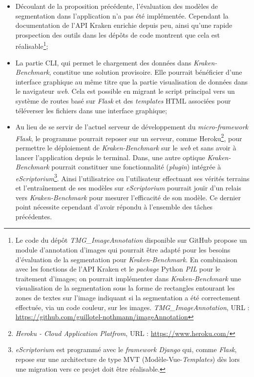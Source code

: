 \begin{itemize}
    \item Découlant de la proposition précédente, l'évaluation des modèles de segmentation dans l'application n'a pas été implémentée. Cependant la documentation de l'API Kraken enrichie depuis peu, ainsi qu'une rapide prospection des outils dans les dépôts de code montrent que cela est réalisable\footnote{Le code du dépôt \textit{TMG\_ImageAnnotation} disponible sur GitHub propose un module d'annotation d'images qui pourrait être adapté pour les besoins d'évaluation de la segmentation pour \textit{Kraken-Benchmark}. En combinaison avec les fonctions de l'API Kraken et le \textit{package} Python \textit{PIL} pour le traitement d'images; on pourrait implémenter dans \textit{Kraken-Benchmark} une visualisation de la segmentation sous la forme de rectangles entourant les zones de textes sur l'image indiquant si la segmentation a été correctement effectuée, via un code couleur, sur les images. \textit{TMG\_ImageAnnotation}, URL : \url{https://github.com/guillotel-nothmann/imageAnnotation}};
    \item La partie CLI, qui permet le chargement des données dans \textit{Kraken-Benchmark}, constitue une solution provisoire. Elle pourrait bénéficier d'une interface graphique au même titre que la partie visualisation de données dans le navigateur \textit{web}. Cela est possible en migrant le script principal  vers un système de routes basé sur \textit{Flask} et des \textit{templates} HTML associées pour téléverser les fichiers dans une interface graphique;
    \item Au lieu de se servir de l'actuel serveur de développement du \textit{micro-framework Flask}, le programme pourrait reposer sur un serveur, comme Heroku\footnote{\textit{Heroku - Cloud Application Platfrom}, URL : \url{https://www.heroku.com/}}, pour permettre le déploiement de \textit{Kraken-Benchmark} sur le \textit{web} et sans avoir à lancer l'application depuis le terminal. Dans, une autre optique \textit{Kraken-Benchmark} pourrait constituer une fonctionnalité (\textit{plugin}) intégrée à \textit{eScriptorium}\footnote{\textit{eScriptorium} est programmé avec le \textit{framework Django} qui, comme \textit{Flask}, repose sur une architecture de type MVT (Modèle-Vue-\textit{Templates}) dès lors une migration vers ce projet doit être réalisable.}. Ainsi l'utilisatrice ou l'utilisateur effectuant ses vérités terrains et l'entraînement de ses modèles sur \textit{eScriptorium} pourrait jouïr d'un relais vers \textit{Kraken-Benchmark} pour mesurer l'efficacité de son modèle. Ce dernier point nécessite cependant d'avoir répondu à l'ensemble des tâches précédentes.
\end{itemize}

